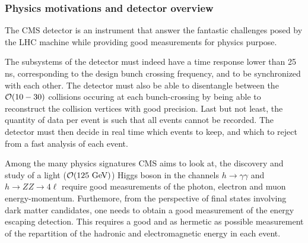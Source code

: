             \subsubsection{Physics motivations and detector overview}

        The CMS detector is an instrument that answer the fantastic challenges posed by
        the LHC machine while providing good measurements for physics purpose.

        The subsystems of the detector must indeed have a time response lower than 25 ns,
        corresponding to the design bunch crossing frequency, and to be synchronized with
        each other. The detector must also be able to disentangle between the
        $\mathcal{O}(10-30)$ collisions occuring at each bunch-crossing by being able to
        reconstruct the collision vertices with good precision. Last but not least,
        the quantity of data per event is such that all events cannot be recorded. The
        detector must then decide in real time which events to keep, and which to reject
        from a fast analysis of each event.

        Among the many physics signatures CMS aims to look at, the discovery and study of a
        light ($\mathcal{O}(125 ~\text{GeV})$) Higgs boson in the channels $h\rightarrow\gamma\gamma$
        and $h\rightarrow ZZ \rightarrow 4\ell$ require good measurements of the photon,
        electron and muon energy-momentum. Furthemore, from the perspective of final
        states involving dark matter candidates, one needs to obtain a good measurement
        of the energy escaping detection. This requires a good and as hermetic as
        possible measurement of the repartition of the hadronic and electromagnetic energy
        in each event.


